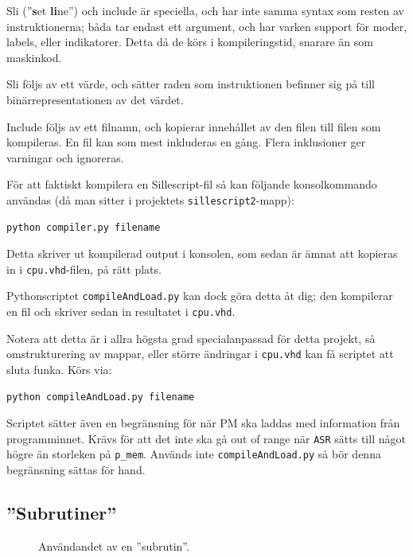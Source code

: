 \documentclass[]{article}
\begin{document}
\noindent
Sli (''\textbf{s}et \textbf{li}ne'') och include är speciella, och har inte samma syntax som resten av instruktionerna; båda tar endast ett argument, och har varken support för moder, labels, eller indikatorer. Detta då de körs i kompileringstid, snarare än som maskinkod.

Sli följs av ett värde, och sätter raden som instruktionen befinner sig på till binärrepresentationen av det värdet.

Include följs av ett filnamn, och kopierar innehållet av den filen till filen som kompileras. En fil kan som mest inkluderas en gång. Flera inklusioner ger varningar och ignoreras.

För att faktiskt kompilera en Sillescript-fil så kan följande konsolkommando användas (då man sitter i projektets \texttt{sillescript2}-mapp):\\

\begin{lstlisting}[frame=single]
python compiler.py filename
\end{lstlisting}

\noindent
Detta skriver ut kompilerad output i konsolen, som sedan är ämnat att kopieras in i \texttt{cpu.vhd}-filen, på rätt plats. 

Pythonscriptet \texttt{compileAndLoad.py} kan dock göra detta åt dig; den kompilerar en fil och skriver sedan in resultatet i \texttt{cpu.vhd}. 

Notera att detta är i allra högsta grad specialanpassad för detta projekt, så omstrukturering av mappar, eller större ändringar i \texttt{cpu.vhd} kan få scriptet att sluta funka. Körs via:\\

\begin{lstlisting}[frame=single]
python compileAndLoad.py filename
\end{lstlisting}

\noindent
Scriptet sätter även en begränsning för när PM ska laddas med information från programminnet. Krävs för att det inte ska gå out of range när \texttt{ASR} sätts till något högre än storleken på \texttt{p\_mem}. Används inte \texttt{compileAndLoad.py} så bör denna begränsning sättas för hand.


\subsection{''Subrutiner''}
\begin{figure}[h!]
	\caption{Användandet av en ''subrutin''. }
\end{figure}
\end{document}
